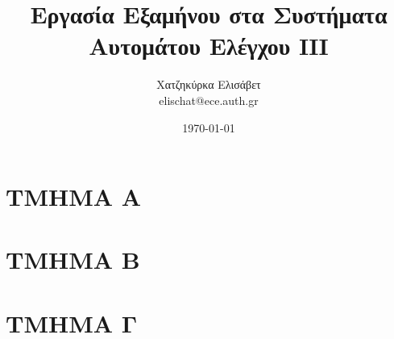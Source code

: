 \documentclass[12pt]{report}
\title{Εργασία Εξαμήνου στα Συστήματα Αυτομάτου Ελέγχου ΙΙΙ}
\author{Χατζηκύρκα Ελισάβετ\\ elischat@ece.auth.gr}
\date{\today}
\begin{document}
\maketitle

\tableofcontents

\chapter{ΤΜΗΜΑ Α}



\chapter{ΤΜΗΜΑ Β}



\chapter{ΤΜΗΜΑ Γ}


\end{document}
